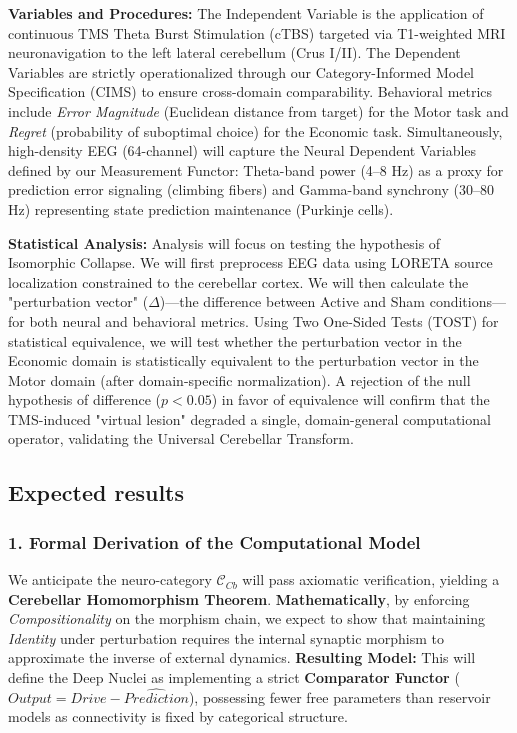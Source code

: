 \documentclass{article}
\begin{document}
	\textbf{Variables and Procedures:} The Independent Variable is the application of continuous TMS Theta Burst Stimulation (cTBS) targeted via T1-weighted MRI neuronavigation to the left lateral cerebellum (Crus I/II). The Dependent Variables are strictly operationalized through our Category-Informed Model Specification (CIMS) to ensure cross-domain comparability. Behavioral metrics include \textit{Error Magnitude} (Euclidean distance from target) for the Motor task and \textit{Regret} (probability of suboptimal choice) for the Economic task. Simultaneously, high-density EEG (64-channel) will capture the Neural Dependent Variables defined by our Measurement Functor: Theta-band power (4--8 Hz) as a proxy for prediction error signaling (climbing fibers) and Gamma-band synchrony (30--80 Hz) representing state prediction maintenance (Purkinje cells).
	
	\textbf{Statistical Analysis:} Analysis will focus on testing the hypothesis of Isomorphic Collapse. We will first preprocess EEG data using LORETA source localization constrained to the cerebellar cortex. We will then calculate the "perturbation vector" ($\Delta$)—the difference between Active and Sham conditions—for both neural and behavioral metrics. Using Two One-Sided Tests (TOST) for statistical equivalence, we will test whether the perturbation vector in the Economic domain is statistically equivalent to the perturbation vector in the Motor domain (after domain-specific normalization). A rejection of the null hypothesis of difference ($p < 0.05$) in favor of equivalence will confirm that the TMS-induced "virtual lesion" degraded a single, domain-general computational operator, validating the Universal Cerebellar Transform.
	
	\subsection{Expected results}
	
	\subsubsection*{1. Formal Derivation of the Computational Model}
	We anticipate the neuro-category $\mathcal{C}_{Cb}$ will pass axiomatic verification, yielding a \textbf{Cerebellar Homomorphism Theorem}. \textbf{Mathematically}, by enforcing \textit{Compositionality} on the morphism chain, we expect to show that maintaining \textit{Identity} under perturbation requires the internal synaptic morphism to approximate the inverse of external dynamics. \textbf{Resulting Model:} This will define the Deep Nuclei as implementing a strict \textbf{Comparator Functor} ($Output = Drive - \hat{Prediction}$), possessing fewer free parameters than reservoir models as connectivity is fixed by categorical structure.
	
\end{document}
